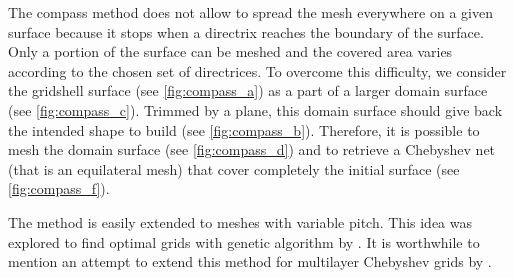 The compass method does not allow to spread the mesh everywhere on a given surface because it stops when a directrix reaches the boundary of the surface. Only a portion of the surface can be meshed and the covered area varies according to the chosen set of directrices. To overcome this difficulty, we consider the gridshell surface (see \cref{fig:compass_a}) as a part of a larger domain surface (see \cref{fig:compass_c}). Trimmed by a plane, this domain surface should give back the intended shape to build (see \cref{fig:compass_b}). Therefore, it is possible to mesh the domain surface (see \cref{fig:compass_d}) and to retrieve a Chebyshev net (that is an equilateral mesh) that cover completely the initial surface (see \cref{fig:compass_f}).

The method is easily extended to meshes with variable pitch. This idea was explored to find optimal grids with genetic algorithm by \citet{Bouhaya2014}. It is worthwhile to mention an attempt to extend this method for multilayer Chebyshev grids by \citet{Lefevre2015}.

